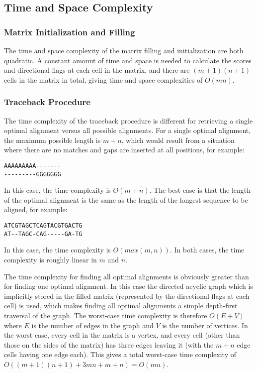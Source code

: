 \documentclass[a4paper]{report}
\begin{document}
\subsection*{Time and Space Complexity}

\subsubsection{Matrix Initialization and Filling}

The time and space complexity of the matrix filling and initialization are both
quadratic. A constant amount of time and space is needed to calculate the scores and
directional flags at each cell in the matrix, and there are $(m + 1)(n + 1)$ cells
in the matrix in total, giving time and space complexities of $O(mn)$.

\subsubsection*{Traceback Procedure}

The time complexity of the traceback procedure is different for retrieving
a single optimal alignment versus all possible alignments. For a single optimal
alignment, the maximum possible length is $m + n$, which would result from a situation
where there are no matches and gaps are inserted at all positions, for example:

\begin{verbatim}
AAAAAAAAA-------
---------GGGGGGG
\end{verbatim}

In this case, the time complexity is $O(m + n)$. The best case is that the length of
the optimal alignment is the same as the length of the longest sequence to be aligned,
for example:

\begin{verbatim}
ATCGTAGCTCAGTACGTGACTG
AT--TAGC-CAG-----GA-TG
\end{verbatim}

In this case, the time complexity is $O(max(m,n))$. In both cases, the time complexity is
roughly linear in $m$ and $n$.

The time complexity for finding all optimal alignments is obviously greater than for
finding one optimal alignment. In this case the directed acyclic graph which is implicitly
stored in the filled matrix (represented by the directional flags at each cell) is used,
which makes finding all optimal alignments a simple depth-first traversal of the graph.
The worst-case time complexity is therefore $O(E + V)$ where $E$ is the number of edges
in the graph and $V$ is the number of vertices. In the worst case, every cell in the matrix
is a vertex, and every cell (other than those on the sides of the matrix) has three edges
leaving it (with the $m + n$ edge cells having one edge each). This gives a total worst-case
time complexity of $O((m + 1)(n + 1) + 3mn + m + n) = O(mn)$.
\end{document}
